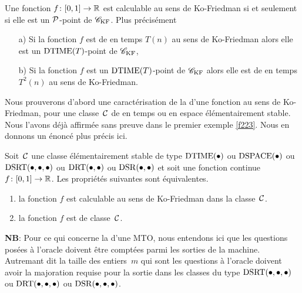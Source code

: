 \begin{fproposition} \label{f414}
Une fonction   $f \colon  [0,1] \rightarrow \mathbb {R}$ est calculable \etpo  au sens de Ko-Friedman si et seulement si elle est un  ${\cal P}$-point de ${{{\mathscr C}}_{\rm KF}}$. Plus précisément 
\begin{itemize}
%
\item [a)] Si la fonction $f$ est de \com en temps  $T(n)$  au sens de Ko-Friedman alors  
elle est un  ${\rm DTIME} (T)$-point de ${{{\mathscr C}}_{\rm KF}}$,
%
\item [b)]	Si la fonction $f$ est un  ${\rm DTIME} (T)$-point de ${{{\mathscr C}}_{\rm KF}}$ alors elle est de \com en temps $T^2(n)$ au sens de Ko-Friedman. 
\end{itemize}
\end{fproposition}
Nous prouverons d'abord une caractérisation de la \com d'une fonction au sens de Ko-Friedman, pour une classe~${{\cal C}}$   de \com en temps ou en espace élémentairement stable. Nous l'avons déjà affirmée sans preuve dans le premier exemple \ref{f223}. Nous en donnons un énoncé plus précis ici.

\begin{fproposition} \label{f415}
Soit~${{\cal C}}$    une classe élémentairement stable de type ${\rm DTIME} (\bullet)$  
ou  ${\rm DSPACE}(\bullet)$  ou ${\rm DSRT}(\bullet, \bullet, \bullet)$  ou  ${\rm DRT}(\bullet, 
\bullet)$  ou  ${\rm DSR}(\bullet, \bullet)$  et soit une fonction continue  
$f \colon  [0,1] \rightarrow \mathbb {R}$. Les propriétés suivantes sont équivalentes. 
%
\begin{enumerate}
%
\item la fonction $f$ est calculable au sens de Ko-Friedman dans la classe~${{\cal C}}$.
%
\item la fonction $f$ est \uni de classe~${{\cal C}}$.
%
\end{enumerate}
{\bf NB}: 
Pour ce qui concerne la \com d'une MTO, nous entendons ici que les questions 
posées à l'oracle doivent être comptées parmi les sorties de la machine. 
Autremant dit la taille des entiers~$m$ qui sont les questions à l'oracle 
doivent avoir la majoration requise pour la sortie dans les classes du type  ${\rm DSRT}(\bullet,\bullet,\bullet)$ ou ${\rm DRT}(\bullet,\bullet,\bullet)$  ou  ${\rm DSR}(\bullet,\bullet,\bullet)$.
\end{fproposition}

